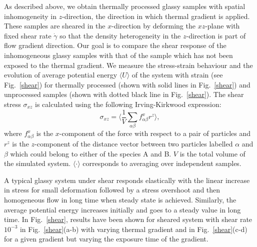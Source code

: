 As described above, we obtain thermally processed glassy samples with spatial inhomogeneity in $z$-direction, the direction in which thermal gradient is applied. These samples are sheared in the $x$-direction by deforming the $xz$-plane with fixed shear rate $\dot{\gamma}$ so that the density heterogeneity in the $z$-direction is part of flow gradient direction. Our goal is to compare the shear response of the inhomogeneous glassy samples with that of the sample which has not been exposed to the thermal gradient. We measure the stress-strain behaviour and the evolution of average potential energy  $\langle U \rangle$ of the system with strain (see Fig.~\ref{shear}) for thermally processed (shown with solid lines in Fig.~\ref{shear}) and unprocessed samples (shown with dotted black line in Fig.~\ref{shear}). The shear stress $\sigma_{xz}$ is calculated using the following Irving-Kirkwood expression: 
    \begin{equation}
        \sigma_{xz} = \langle \frac{1}{V} \sum_{\alpha\beta} f^{x}_{\alpha\beta} r^{z} \rangle,
    \end{equation}
where $f^{x}_{\alpha\beta}$ is the $x$-component of the force with respect to a pair of particles and $r^z$ is the $z$-component of the distance vector between two particles labelled $\alpha$ and $\beta$ which could belong to either of the species A and B. $V$ is the total volume of the simulated system. $\langle\cdot\rangle$ corresponds to averaging over independent samples.
    
A typical glassy system under shear responds elastically with the linear increase in stress for small deformation followed by a stress overshoot and then homogeneous flow in long time when steady state is achieved. Similarly, the average potential energy increases initially and goes to a steady value in long time. In Fig.~\ref{shear}, results have been shown for sheared system with shear rate $10^{-3}$ in Fig.~\ref{shear}(a-b) with varying thermal gradient and in Fig.~\ref{shear}(c-d) for a given gradient but varying the exposure time of the gradient.

